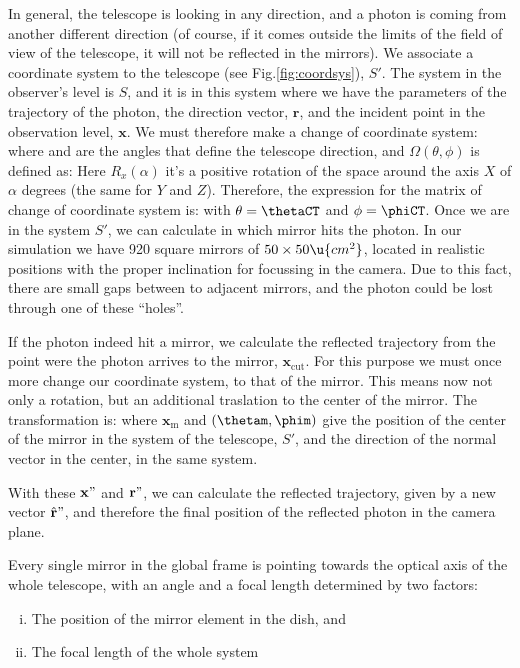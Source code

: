 In general, the telescope is looking in any direction, and a photon is
coming from another different direction (of course, if it comes
outside the limits of the field of view of the telescope, it will not
be reflected in the mirrors). We associate a coordinate system to the
telescope (see Fig.\ref{fig:coordsys}), $S'$. The system in the
observer's level is $S$, and it is in this system where we have the
parameters of the trajectory of the photon, the direction vector,
$\mathbf{r}$, and the incident point in the observation level,
$\mathbf{x}$. We must therefore make a change of coordinate system:
%
\rotateAeq
%
where \thetaCT and \phiCT are the angles that define the telescope
direction, and $\Omega(\theta,\phi)$ is defined as:
%
\omegaAeq
%
Here $R_x(\alpha)$ it's a positive rotation of the space around the
axis $X$ of $\alpha$ degrees (the same for $Y$ and $Z$). Therefore,
the expression for the matrix of change of coordinate system is:
%
\transformAeq
%
with $\theta=\thetaCT$ and $\phi=\phiCT$. Once we are in the system
$S'$, we can calculate in which mirror hits the photon. In our
simulation we have 920 square mirrors of $50\times 50\u{cm^2}$,
located in realistic positions with the proper inclination for
focussing in the camera. Due to this fact, there are small gaps
between to adjacent mirrors, and the photon could be lost through one
of these ``holes''.

If the photon indeed hit a mirror, we calculate the reflected
trajectory from the point were the photon arrives to the mirror,
$\mathbf{x}_{\mathrm{cut}}$. For this purpose we must once more change
our coordinate system, to that of the mirror. This means now not only
a rotation, but an additional traslation to the center of the mirror.
The transformation is:
%
\transformBeq
%
where $\mathbf{x}_{\mathrm{m}}$ and $(\thetam,\phim)$ give the
position of the center of the mirror in the system of the telescope,
$S'$, and the direction of the normal vector in the center, in the
same system.

With these $\mathbf{x}"$ and $\mathbf{r}"$, we can calculate the
reflected trajectory, given by a new vector $\hat{\mathbf{r}}"$, and
therefore the final position of the reflected photon in the camera
plane.

Every single mirror in the global frame is pointing towards the
optical axis of the whole telescope, with an angle and a focal length
determined by two factors:

\begin{enumerate}[i.]
\item The position of the mirror element in the dish, and
\item The focal length of the whole system
\end{enumerate}

